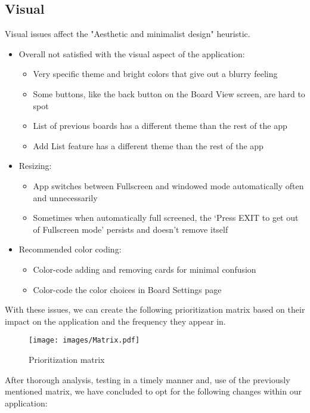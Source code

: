 \subsection{Visual}
Visual issues affect the "Aesthetic and minimalist design" heuristic.
\begin{itemize}
    \item Overall not satisfied with the visual aspect of the application:
    \begin{itemize}
        \item Very specific theme and bright colors that give out a blurry feeling
        \item Some buttons, like the back button on the Board View screen, are hard to spot
        \item List of previous boards has a different theme than the rest of the app
        \item Add List feature has a different theme than the rest of the app
    \end{itemize}
        \item Resizing:
    \begin{itemize}
        \item App switches between Fullscreen and windowed mode automatically often and unnecessarily
        \item Sometimes when automatically full screened, the ‘Press EXIT to get out of Fullscreen mode’ persists and doesn’t remove itself
    \end{itemize}
        \item Recommended color coding:
    \begin{itemize}
        \item Color-code adding and removing cards for minimal confusion
        \item Color-code the color choices in Board Settings page
    \end{itemize}
\end{itemize}

With these issues, we can create the following prioritization matrix based on their impact on the application and the frequency they appear in.

 \begin{figure}[ht]
    \centering
    \texttt{[image: images/Matrix.pdf]}
    \caption{Prioritization matrix}
    \label{fig:my_label}
\end{figure}

After thorough analysis, testing in a timely manner and, use of the previously mentioned matrix, we have concluded to opt for the following changes within our application: